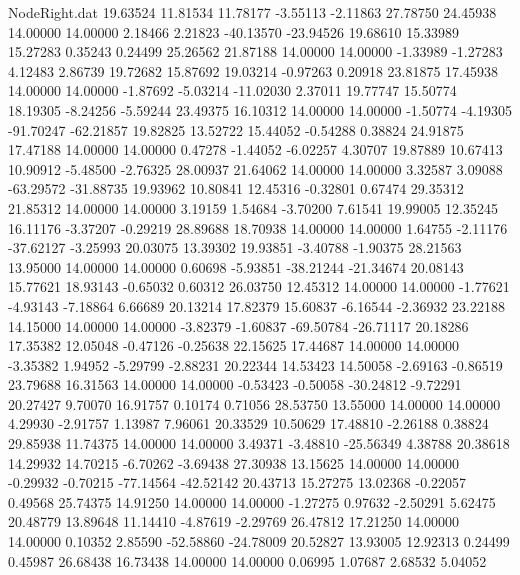 \begin{filecontents}{NodeRight.dat}
  19.63524   11.81534   11.78177    -3.55113   -2.11863   27.78750   24.45938   14.00000   14.00000    2.18466    2.21823  -40.13570  -23.94526
  19.68610   15.33989   15.27283     0.35243    0.24499   25.26562   21.87188   14.00000   14.00000   -1.33989   -1.27283    4.12483    2.86739
  19.72682   15.87692   19.03214    -0.97263    0.20918   23.81875   17.45938   14.00000   14.00000   -1.87692   -5.03214  -11.02030    2.37011
  19.77747   15.50774   18.19305    -8.24256   -5.59244   23.49375   16.10312   14.00000   14.00000   -1.50774   -4.19305  -91.70247  -62.21857
  19.82825   13.52722   15.44052    -0.54288    0.38824   24.91875   17.47188   14.00000   14.00000    0.47278   -1.44052   -6.02257    4.30707
  19.87889   10.67413   10.90912    -5.48500   -2.76325   28.00937   21.64062   14.00000   14.00000    3.32587    3.09088  -63.29572  -31.88735
  19.93962   10.80841   12.45316    -0.32801    0.67474   29.35312   21.85312   14.00000   14.00000    3.19159    1.54684   -3.70200    7.61541
  19.99005   12.35245   16.11176    -3.37207   -0.29219   28.89688   18.70938   14.00000   14.00000    1.64755   -2.11176  -37.62127   -3.25993
  20.03075   13.39302   19.93851    -3.40788   -1.90375   28.21563   13.95000   14.00000   14.00000    0.60698   -5.93851  -38.21244  -21.34674
  20.08143   15.77621   18.93143    -0.65032    0.60312   26.03750   12.45312   14.00000   14.00000   -1.77621   -4.93143   -7.18864    6.66689
  20.13214   17.82379   15.60837    -6.16544   -2.36932   23.22188   14.15000   14.00000   14.00000   -3.82379   -1.60837  -69.50784  -26.71117
  20.18286   17.35382   12.05048    -0.47126   -0.25638   22.15625   17.44687   14.00000   14.00000   -3.35382    1.94952   -5.29799   -2.88231
  20.22344   14.53423   14.50058    -2.69163   -0.86519   23.79688   16.31563   14.00000   14.00000   -0.53423   -0.50058  -30.24812   -9.72291
  20.27427    9.70070   16.91757     0.10174    0.71056   28.53750   13.55000   14.00000   14.00000    4.29930   -2.91757    1.13987    7.96061
  20.33529   10.50629   17.48810    -2.26188    0.38824   29.85938   11.74375   14.00000   14.00000    3.49371   -3.48810  -25.56349    4.38788
  20.38618   14.29932   14.70215    -6.70262   -3.69438   27.30938   13.15625   14.00000   14.00000   -0.29932   -0.70215  -77.14564  -42.52142
  20.43713   15.27275   13.02368    -0.22057    0.49568   25.74375   14.91250   14.00000   14.00000   -1.27275    0.97632   -2.50291    5.62475
  20.48779   13.89648   11.14410    -4.87619   -2.29769   26.47812   17.21250   14.00000   14.00000    0.10352    2.85590  -52.58860  -24.78009
  20.52827   13.93005   12.92313     0.24499    0.45987   26.68438   16.73438   14.00000   14.00000    0.06995    1.07687    2.68532    5.04052

\end{filecontents}
